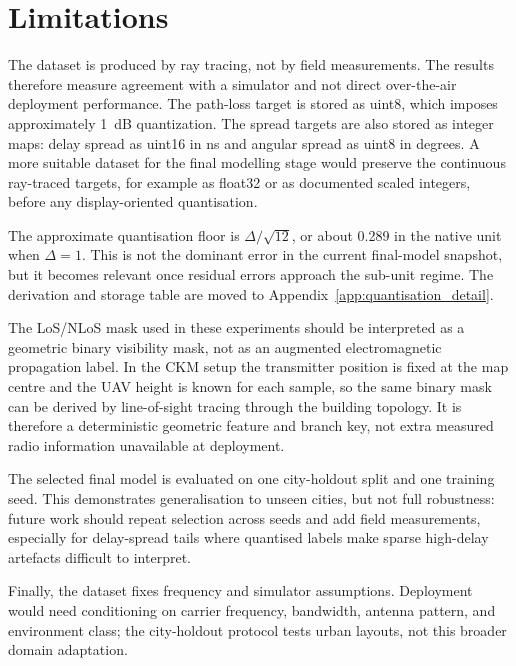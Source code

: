\section{Limitations}

The dataset is produced by ray tracing, not by field measurements. The results
therefore measure agreement with a simulator and not direct over-the-air
deployment performance. The path-loss target is stored as uint8, which imposes
approximately \SI{1}{dB} quantization. The spread targets are also stored as
integer maps: delay spread as uint16 in ns and angular spread as uint8 in
degrees. A more suitable dataset for the final modelling stage would preserve
the continuous ray-traced targets, for example as float32 or as documented
scaled integers, before any display-oriented quantisation.

The approximate quantisation floor is \(\Delta/\sqrt{12}\), or about
\SI{0.289}{} in the native unit when \(\Delta=1\). This is not the dominant
error in the current final-model snapshot, but it becomes relevant once residual
errors approach the sub-unit regime. The derivation and storage table are moved
to Appendix~\ref{app:quantisation_detail}.

The LoS/NLoS mask used in these experiments should be interpreted as a
geometric binary visibility mask, not as an augmented electromagnetic
propagation label. In the CKM setup the transmitter position is fixed at the
map centre and the UAV height is known for each sample, so the same binary mask
can be derived by line-of-sight tracing through the building topology. It is
therefore a deterministic geometric feature and branch key, not extra measured
radio information unavailable at deployment.

The selected final model is evaluated on one city-holdout split and one
training seed. This demonstrates generalisation to unseen cities, but not full
robustness: future work should repeat selection across seeds and add field
measurements, especially for delay-spread tails where quantised labels make
sparse high-delay artefacts difficult to interpret.

Finally, the dataset fixes frequency and simulator assumptions. Deployment
would need conditioning on carrier frequency, bandwidth, antenna pattern, and
environment class; the city-holdout protocol tests urban layouts, not this
broader domain adaptation.

